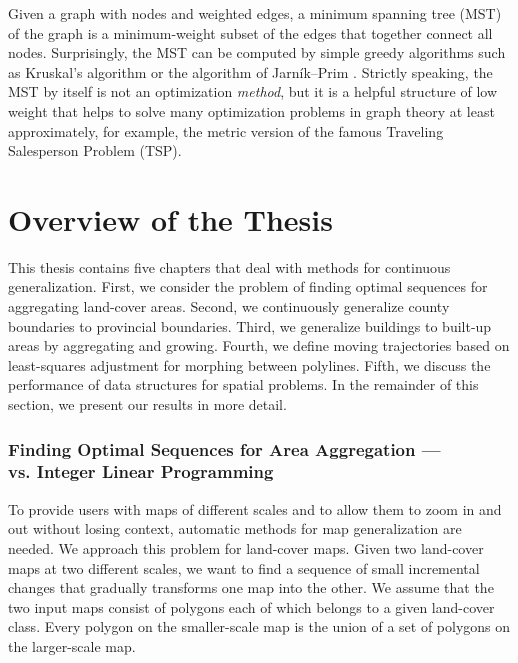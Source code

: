 Given a graph with nodes and weighted edges, 
a minimum spanning tree (MST) of the graph is a minimum-weight subset
of the edges that together connect all nodes.
Surprisingly, the MST can be computed by simple greedy algorithms
such as Kruskal's algorithm \parencite{Kruskal1956}
or the algorithm of Jarn\'ik--Prim \parencite{Jarnik1930,Prim1957}.
Strictly speaking, the MST by itself is not an optimization
\emph{method}, but it is a helpful structure of low weight that helps
to solve many optimization problems in graph theory at least
approximately, for example, the metric version of the famous Traveling
Salesperson Problem (TSP).


\section{Overview of the Thesis}
\label{sec:Intro_Overview}

This thesis contains five chapters that deal with methods for 
continuous 
generalization. 
First, we consider the problem of finding 
optimal sequences for aggregating land-cover areas.
%
Second, we continuously generalize county boundaries to
provincial boundaries.
%
Third, we generalize buildings to built-up areas 
by aggregating and growing.
%
Fourth, we define moving trajectories
based on least-squares adjustment
for morphing between polylines.
%
Fifth, we discuss the performance 
of data structures for spatial problems.
In the remainder of this section, 
we present our results in more detail.


\subsubsection{Finding Optimal Sequences for Area Aggregation ---\\ 
	\Astar vs. Integer Linear Programming}

To provide users with maps of different scales and 
to allow them to zoom in and out without losing context,
automatic methods for map generalization are needed.
We approach this problem for land-cover maps.
Given two land-cover maps at two different scales, 
we want to find a sequence of small incremental
changes that gradually transforms one map into the other.
We assume that the two input maps consist of polygons 
each of which belongs to a given land-cover class. 
Every polygon on the smaller-scale map
is the union of a set of polygons on the larger-scale map. 

